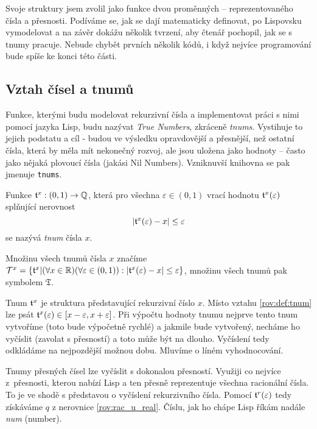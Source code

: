 Svoje struktury jsem zvolil jako funkce dvou proměnných -- reprezentovaného čísla a přesnosti. Podíváme se, jak se dají matematicky definovat, po Lispovsku vymodelovat a na závěr dokážu několik tvrzení, aby čtenář pochopil, jak se s tnumy pracuje. Nebude chybět prvních několik kódů, i když nejvíce programování bude spíše ke konci této části.

\subsection{Vztah čísel a tnumů}
Funkce, kterými budu modelovat rekurzivní čísla a implementovat práci s nimi pomocí jazyka Lisp, budu nazývat \textit{True Numbers}, zkráceně \textit{tnums}. Vystihuje to jejich podstatu a cíl - budou ve výsledku opravdovější a přesnější, než ostatní čísla, která by měla mít nekonečný rozvoj, ale jsou uložena jako hodnoty – často jako nějaká plovoucí čísla (jakási Nil Numbers). Vzniknuvší knihovna se pak jmenuje \texttt{tnums}.

\begin{definition}[Tnum]\label{def:tnum}
Funkce $\mathfrak{t}^{x}:(0,1)\rightarrow\mathbb{Q}$, která pro všechna $\varepsilon\in (0,1)$ vrací hodnotu $\mathfrak{t}^{x}(\varepsilon)$ splňující nerovnost
\begin{equation}\label{rov:def:tnum}
|\mathfrak{t}^{x}(\varepsilon) - x |\leq \varepsilon
\end{equation}
se nazývá \textit{tnum} čísla $x$.

Množinu všech tnumů čísla $x$ značíme $\mathcal{T}^{x}=\{\mathfrak{t}^{x}|(\forall x \in\mathbb{R})(\forall\varepsilon\in (0,1)):|\mathfrak{t}^{x}(\varepsilon)-x|\leq\varepsilon\}$, množinu všech tnumů pak symbolem $\mathfrak{T}$.
\end{definition}

Tnum $\mathfrak{t}^{x}$ je struktura představující rekurzivní číslo $x$. Místo vztahu \ref{rov:def:tnum} lze psát $\mathfrak{t}^{x}(\varepsilon)\in[x-\varepsilon,x+\varepsilon]$. Při výpočtu hodnoty tnumu nejprve tento tnum vytvoříme (toto bude výpočetně rychlé) a jakmile bude vytvořený, necháme ho vyčíslit (zavolat s přesností) a toto může být na dlouho. Vyčíslení tedy odkládáme na nejpozdější možnou dobu. Mluvíme o líném vyhodnocování.

Tnumy přesných čísel lze vyčíslit s dokonalou přesností. Využiji co nejvíce z~přesnosti, kterou nabízí Lisp a ten přesně reprezentuje všechna racionální čísla. To je ve shodě s představou o vyčíslení rekurzivního čísla. Pomocí $\mathfrak{t}^{r}(\varepsilon)$ tedy získáváme $q$ z nerovnice \ref{rov:rac_u_real}. Číslu, jak ho chápe Lisp říkám nadále \textit{num} (number).

